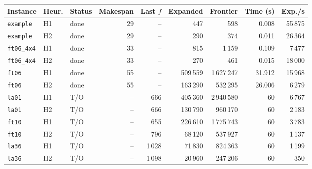 \begin{tabular}{lllrrrrrr}
\toprule
Instance & Heur. & Status & Makespan & Last $f$ & Expanded & Frontier & Time (s) & Exp./s \\
\midrule
\texttt{example} & H1 & done & 29 & -- & 447 & 598 & 0.008 & 55\,875 \\
\texttt{example} & H2 & done & 29 & -- & 290 & 374 & 0.011 & 26\,364 \\
\texttt{ft06\_4x4} & H1 & done & 33 & -- & 815 & 1\,159 & 0.109 & 7\,477 \\
\texttt{ft06\_4x4} & H2 & done & 33 & -- & 270 & 461 & 0.015 & 18\,000 \\
\texttt{ft06} & H1 & done & 55 & -- & 509\,559 & 1\,627\,247 & 31.912 & 15\,968 \\
\texttt{ft06} & H2 & done & 55 & -- & 163\,290 & 532\,295 & 26.006 & 6\,279 \\
\texttt{la01} & H1 & T/O & -- & 666 & 405\,360 & 2\,940\,580 & 60 & 6\,767 \\
\texttt{la01} & H2 & T/O & -- & 666 & 130\,790 & 960\,170 & 60 & 2\,183 \\
\texttt{ft10} & H1 & T/O & -- & 655 & 226\,610 & 1\,775\,743 & 60 & 3\,783 \\
\texttt{ft10} & H2 & T/O & -- & 796 & 68\,120 & 537\,927 & 60 & 1\,137 \\
\texttt{la36} & H1 & T/O & -- & 1\,028 & 71\,830 & 824\,363 & 60 & 1\,199 \\
\texttt{la36} & H2 & T/O & -- & 1\,098 & 20\,960 & 247\,206 & 60 & 350 \\
\bottomrule
\end{tabular}
